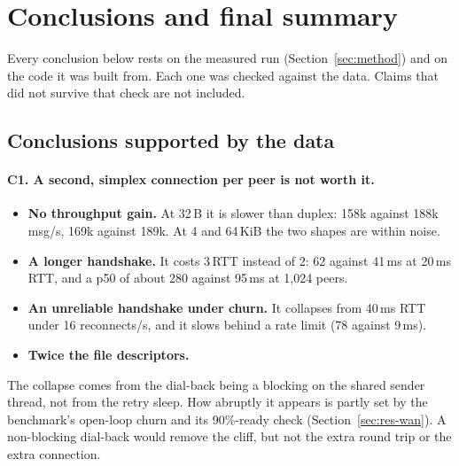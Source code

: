 \section{Conclusions and final summary}
\label{sec:conclusions}

Every conclusion below rests on the measured run (Section~\ref{sec:method}) and on
the code it was built from. Each one was checked against the data. Claims that did not survive that
check are not included.

\subsection{Conclusions supported by the data}

\paragraph{C1. A second, simplex connection per peer is not worth it.}
\begin{itemize}
  \item \textbf{No throughput gain.} At 32\,B it is slower than duplex: 
        158k against 188k msg/s,  169k against 189k. At 4 and 64\,KiB the
        two shapes are within noise.
  \item \textbf{A longer handshake.} It costs 3\,RTT instead of 2: 62 against 41\,ms at
        20\,ms RTT, and a p50 of about 280 against 95\,ms at 1,024 peers.
  \item \textbf{An unreliable handshake under churn.} It collapses from 40\,ms RTT
        under 16 reconnects/s, and it slows behind a rate limit (78 against 9\,ms).
  \item \textbf{Twice the file descriptors.}
\end{itemize}
The collapse comes from the dial-back being a blocking  on the shared
sender thread, not from the retry sleep. How abruptly it appears is partly set by the
benchmark's open-loop churn and its 90\%-ready check (Section~\ref{sec:res-wan}). A non-blocking dial-back would remove the cliff, but not the extra
round trip or the extra connection.

